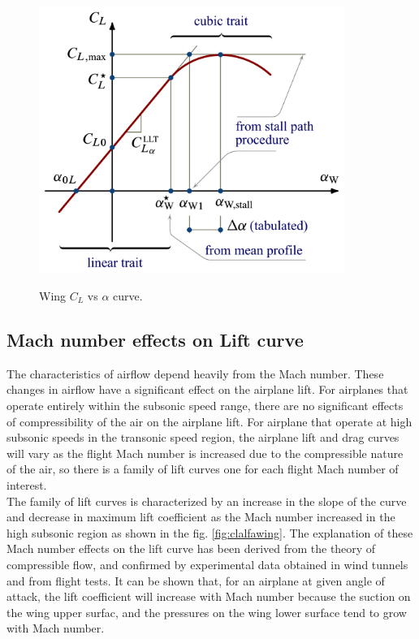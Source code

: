 \begin{figure}[H]
\centering
{\includegraphics[height=8.69cm]{Immagini/Wing_CL_Vs_alpha_curve.pdf}} 
\caption{Wing $C_L$ vs $\alpha$ curve.}
\label{fig:clalfa}
\end{figure}



\subsection{Mach number effects on Lift curve }
The characteristics of airflow depend heavily from the Mach number. These changes in airflow have a significant effect on the airplane lift. For airplanes that operate entirely within the subsonic speed range, there are no significant effects of compressibility of the air on the airplane lift. For airplane that operate at high subsonic speeds in the transonic speed region, the airplane lift and drag curves will vary as the flight Mach number is increased due to the compressible nature of the air, so there is a family of lift curves one for each flight Mach number of interest.\\
The family of lift curves is characterized by an increase in the slope of the curve and decrease in maximum lift coefficient as the Mach number increased in the high subsonic region as shown in the fig. \ref{fig:clalfawing}.
The explanation of these Mach number effects on the lift curve has been derived from the theory of compressible flow, and confirmed by experimental data obtained in wind tunnels and from flight tests. It can be shown that, for an airplane at given angle of attack, the lift coefficient will increase with Mach number because the suction on the wing upper surfac, and the pressures on the wing lower surface tend to grow with Mach number.  \cite{manual}

